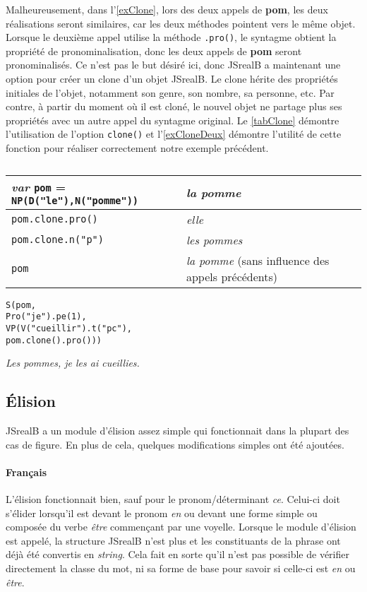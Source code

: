 \documentclass[11pt]{article} %
\newcommand{\system}[1]{\textsf{#1}}
\newcommand{\JSB}{\system{JSrealB}}
\newcommand{\real}[1]{\emph{#1}}
\begin{document}
Malheureusement, dans l'\autoref{exClone}, lors des deux appels de \textbf{pom}, les deux réalisations
seront similaires, car les deux méthodes pointent vers le même objet.
Lorsque le deuxième appel utilise la méthode \texttt{.pro()}, le syntagme
obtient la propriété de pronominalisation, donc les deux appels de
\textbf{pom} seront pronominalisés. Ce n'est pas le but désiré ici,
donc \JSB{} a maintenant une option pour créer un clone d'un objet
\JSB{}. Le clone hérite des propriétés initiales de l'objet, notamment
son genre, son nombre, sa personne, etc. Par contre, à partir du moment
où il est cloné, le nouvel objet ne partage plus ses propriétés avec
un autre appel du syntagme original. Le \autoref{tabClone} démontre l'utilisation
de l'option \texttt{clone()} et l'\autoref{exCloneDeux} démontre l'utilité de cette 
fonction pour réaliser correctement notre exemple précédent. \\
\begin{table}[ht]
\caption{}
\begin{tabular}{|l|l|}
\hline 
\emph{var} \texttt{pom} = \texttt{NP(D("le"),N("pomme"))} & \real{la pomme}\\
\hline 
\hline 
\texttt{pom.clone.pro()} & \real{elle}\\
\hline 
\texttt{pom.clone.n("p")} & \real{les pommes}\\
\hline 
\texttt{pom} & \real{la pomme} {\small{}(sans influence des appels
précédents)}\\
\hline 
\end{tabular} 
\label{tabClone}
\end{table}

\begin{example}
\caption{}
\begin{alltt}
S(pom,
  Pro("je").pe(1),
  VP(V("cueillir").t("pc"),
     pom.clone().pro()))
\end{alltt}
\real{Les pommes, je les ai cueillies.}
\label{exCloneDeux}
\end{example}

\subsection{Élision}

\JSB{} a un module d'élision assez simple qui fonctionnait dans la plupart des cas de figure.
En plus de cela, quelques modifications simples ont été ajoutées.
\paragraph{Français}
L'élision fonctionnait bien, sauf pour le pronom/déterminant \emph{ce}. Celui-ci doit
s'élider lorsqu'il est devant le pronom \emph{en} ou devant une forme simple ou composée
du verbe \emph{être} commençant par une voyelle. Lorsque le module d'élision est appelé, la structure \JSB{} n'est plus 
et les constituants de la phrase ont déjà été convertis en \emph{string}. Cela fait en sorte
qu'il n'est pas possible de vérifier directement la classe du mot, ni sa forme de base pour savoir
si celle-ci est \emph{en} ou \emph{être}. 
\end{document}
